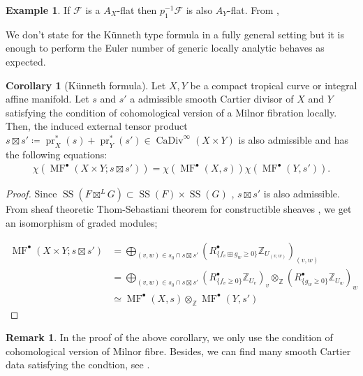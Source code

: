 \documentclass[a4paper,dvipdfmx,reqno,12pt]{amsart}
\theoremstyle{definition}
\newtheorem{Eg}[Thm]{Example}
\newtheorem{Cor}[Thm]{Corollary}
\newtheorem{Rmk}[Thm]{Remark}
\newcommand{\deq}{\coloneqq}
\newcommand{\Z}{\mathbb{Z}}%
\newcommand{\mcal}[1]{\mathcal{#1}}%
\newcommand{\opn}[1]{\operatorname{#1}}
\numberwithin{equation}{section}
\begin{document}
\begin{Eg}

If $\mcal{F}$ is a $A_X$-flat then $p_1^{-1}\mcal{F}$ is also 
$A_Y$-flat. From \cite[(2.2.7)]{},
\end{Eg}

We don't state for the K\"unneth type formula in a fully
general setting but it is enough to perform the Euler number of
generic locally analytic  behaves as expected.
\begin{Cor}[{K\"unneth formula}]
Let $X,Y$ be a compact tropical curve or integral affine manifold.
Let $s$ and $s'$ a admissible smooth Cartier divisor of $X$ and $Y$ 
satisfying the condition of cohomological version of a Milnor 
fibration \cite[Assumption 1.1.1]{MR2031639} locally.
Then, the induced external tensor product 
$s\boxtimes s'\deq \opn{pr}_X^{*} (s)+\opn{pr}_Y^{*}(s')
\in \opn{CaDiv}^{\infty}(X\times Y)$ is also admissible and
has the following equations:
\begin{align}
\chi(\opn{MF}^{\bullet}(X\times Y;s\boxtimes s'))=
\chi(\opn{MF}^{\bullet}(X,s))\chi(\opn{MF}^{\bullet}(Y,s')).
\end{align}

\end{Cor}
\begin{proof}
Since 
$\opn{SS}(F\boxtimes^{L} G)\subset \opn{SS}(F)\times \opn{SS}(G)$
\cite[Proposition 5.4.1]{MR1299726},
$s\boxtimes s'$ is also admissible.
From sheaf theoretic Thom-Sebastiani theorem for constructible sheaves 
\cite[Corollary 1.2.1]{MR2031639}, we get an isomorphism of 
graded modules;

\begin{align}
\opn{MF}^{\bullet}(X\times Y;s\boxtimes s') 
& =\bigoplus_{(v,w)\in s_0\cap s\boxtimes s'}
(R^{\bullet}_{\{f_v\boxplus g_w\geq 0\}}\Z_{U_{(v,w)}})_{(v,w)} \\
& =\bigoplus_{(v,w)\in s_0\cap s\boxtimes s'}
(R^{\bullet}_{\{f_v\geq 0\}}\Z_{U_v})_v
\otimes_{\Z} (R^{\bullet}_{\{g_w\geq 0\}}\Z_{U_w})_w \\
& \simeq
\opn{MF}^{\bullet}(X,s)\otimes_{\Z} \opn{MF}^{\bullet}(Y,s') 
\end{align}

\end{proof}

\begin{Rmk}
In the proof of the above corollary, we only use
the condition of cohomological version of Milnor fibre. 
Besides, we can find many smooth Cartier data satisfying 
the condtion, see \cite[p.35]{MR2031639}.  
\end{Rmk}
\end{document}
